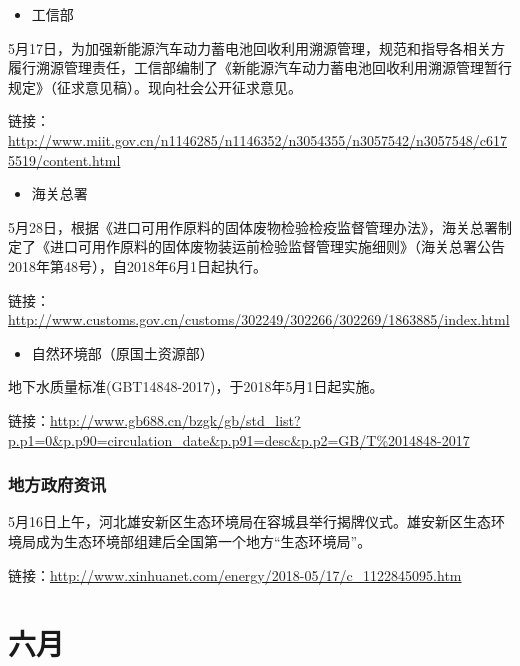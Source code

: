 \documentclass[
]{book}
\providecommand{\tightlist}{%
  \setlength{\itemsep}{0pt}\setlength{\parskip}{0pt}}
\begin{document}
\begin{itemize}
\tightlist
\item
  工信部
\end{itemize}

5月17日，为加强新能源汽车动力蓄电池回收利用溯源管理，规范和指导各相关方履行溯源管理责任，工信部编制了《新能源汽车动力蓄电池回收利用溯源管理暂行规定》（征求意见稿）。现向社会公开征求意见。

链接：\url{http://www.miit.gov.cn/n1146285/n1146352/n3054355/n3057542/n3057548/c6175519/content.html}

\begin{itemize}
\tightlist
\item
  海关总署
\end{itemize}

5月28日，根据《进口可用作原料的固体废物检验检疫监督管理办法》，海关总署制定了《进口可用作原料的固体废物装运前检验监督管理实施细则》（海关总署公告2018年第48号），自2018年6月1日起执行。

链接：\url{http://www.customs.gov.cn/customs/302249/302266/302269/1863885/index.html}

\begin{itemize}
\tightlist
\item
  自然环境部（原国土资源部）
\end{itemize}

地下水质量标准(GBT14848-2017)，于2018年5月1日起实施。

链接：\url{http://www.gb688.cn/bzgk/gb/std_list?p.p1=0\&p.p90=circulation_date\&p.p91=desc\&p.p2=GB/T\%2014848-2017}

\hypertarget{ux5730ux65b9ux653fux5e9cux8d44ux8baf}{%
\subsubsection*{地方政府资讯}\label{ux5730ux65b9ux653fux5e9cux8d44ux8baf}}

5月16日上午，河北雄安新区生态环境局在容城县举行揭牌仪式。雄安新区生态环境局成为生态环境部组建后全国第一个地方``生态环境局''。

链接：\url{http://www.xinhuanet.com/energy/2018-05/17/c_1122845095.htm}

\hypertarget{ux516dux6708}{%
\section*{六月}\label{ux516dux6708}}
\end{document}
